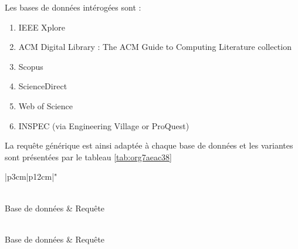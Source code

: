 \documentclass[11pt]{article}
\begin{document}
Les bases de données intérogées sont :
\begin{enumerate}
\item IEEE Xplore
\item ACM Digital Library : The ACM Guide to Computing Literature collection
\item Scopus
\item ScienceDirect
\item Web of Science
\item INSPEC (via Engineering Village or ProQuest)
\end{enumerate}

La requête générique est ainsi adaptée à chaque base de données et les variantes sont présentées par le tableau \ref{tab:org7aeac38}

\begin{longtable}{|p{3cm}|p{12cm}|"}
\caption{\label{tab:org7aeac38}Déclinaison de la requête générique par bases de données ciblées}
\\
\hline
Base de données & Requête\\
\hline
\endfirsthead
{} \\
\hline

Base de données & Requête \\


\end{longtable}
\end{document}
